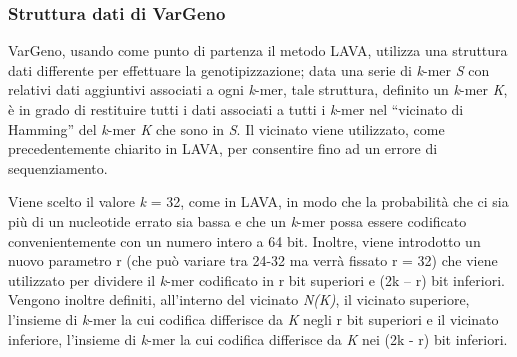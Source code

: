 \documentclass[../main.tex]{subfiles}
\begin{document}
\subsubsection{Struttura dati di VarGeno}
VarGeno, usando come punto di partenza il metodo LAVA, utilizza una struttura dati differente per effettuare la genotipizzazione; data una serie di \textit{k}-mer \textit{S} con relativi dati aggiuntivi associati a ogni \textit{k}-mer, tale struttura, definito un \textit{k}-mer \textit{K}, è in grado di restituire tutti i dati associati a tutti i \textit{k}-mer nel “vicinato di Hamming” del \textit{k}-mer \textit{K} che sono in \textit{S}. Il vicinato viene utilizzato, come precedentemente chiarito in LAVA, per consentire fino ad un errore di sequenziamento.

Viene scelto il valore \textit{k} = 32, come in LAVA, in modo che la probabilità che ci sia più di un nucleotide errato sia bassa e che un \textit{k}-mer possa essere codificato convenientemente con un numero intero a 64 bit. Inoltre, viene introdotto un nuovo parametro r (che può variare tra 24-32 ma verrà fissato r = 32) che viene utilizzato per dividere il \textit{k}-mer codificato in r bit superiori e (2k – r) bit inferiori. Vengono inoltre definiti, all'interno del vicinato \textit{N(K)}, il vicinato superiore, l'insieme di \textit{k}-mer la cui codifica differisce da \textit{K} negli r bit superiori e il vicinato inferiore, l'insieme di \textit{k}-mer la cui codifica differisce da \textit{K} nei (2k - r) bit inferiori.
\end{document}
